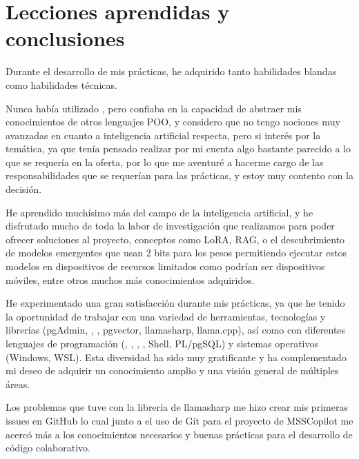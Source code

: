 \chapter{Lecciones aprendidas y conclusiones}
Durante el desarrollo de mis prácticas, he adquirido tanto habilidades blandas como habilidades técnicas. 

Nunca había utilizado \href{https://dotnet.microsoft.com/es-es/languages/csharp}{}, pero confiaba en la capacidad de abstraer mis conocimientos de otros lenguajes POO, y considero que no tengo nociones muy avanzadas en cuanto a inteligencia artificial respecta, pero si interés por la temática, ya que tenía pensado realizar por mi cuenta algo bastante parecido a lo que se requería en la oferta, por lo que me aventuré a hacerme cargo de las responsabilidades que se requerían para las prácticas, y estoy muy contento con la decisión.

He aprendido muchísimo más del campo de la inteligencia artificial, y he disfrutado mucho de toda la labor de investigación que realizamos para poder ofrecer soluciones al proyecto, conceptos como LoRA, RAG, o el descubrimiento de modelos \href{https://en.wikipedia.org/wiki/Large_language_model}{} emergentes que usan 2 bits para los pesos permitiendo ejecutar estos modelos en dispositivos de recursos limitados como podrían ser dispositivos móviles, entre otros muchos más conocimientos adquiridos.

He experimentado una gran satisfacción durante mis prácticas, ya que he tenido la oportunidad de trabajar con una variedad de herramientas, tecnologías y librerías (pgAdmin, \href{https://www.sqlite.org/}{}, 
\href{https://es.wikipedia.org/wiki/CUDA}{}, pgvector, llamasharp, llama.cpp), así como con diferentes lenguajes de programación (\href{https://en.wikipedia.org/wiki/C_(programming_language)}{}, \href{https://en.wikipedia.org/wiki/C%2B%2B}{\bold{C++}}, \href{https://dotnet.microsoft.com/es-es/languages/csharp}{\bold{C\#}}, \href{https://www.python.org/}{\bold{Python}}, Shell, PL/pgSQL) y sistemas operativos (Windows, WSL). Esta diversidad ha sido muy gratificante y ha complementado mi deseo de adquirir un conocimiento amplio y una visión general de múltiples áreas.

Los problemas que tuve con la librería de llamasharp me hizo crear mis primeras issues en GitHub lo cual junto a el uso de Git para el proyecto de MSSCopilot me acercó más a los conocimientos necesarios y buenas prácticas para el desarrollo de código colaborativo. 

